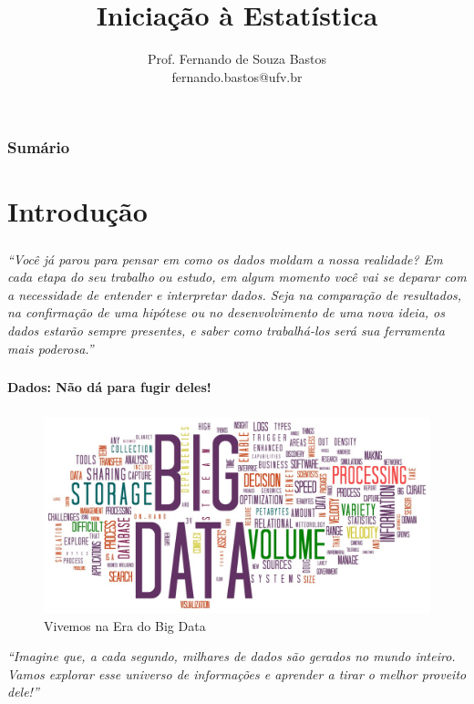 \documentclass[12pt]{beamer}
\title{Iniciação à Estatística}
\author{Prof. Fernando de Souza Bastos\texorpdfstring{\\ fernando.bastos@ufv.br}{}}
\institute{Departamento de Estatística\texorpdfstring{\\ Universidade Federal de Viçosa}{}\texorpdfstring{\\ Campus UFV - Viçosa}{}}
\date{}
\begin{document}

\frame{\titlepage}

\begin{frame}{}
\frametitle{\bf Sumário}
\tableofcontents
\end{frame}

\section{Introdução}
\begin{frame}{}
	\frametitle{}
	\begin{block}{}
		\justifying
		\textit{``Você já parou para pensar em como os dados moldam a nossa realidade? Em cada etapa do seu trabalho ou estudo, em algum momento você vai se deparar com a necessidade de entender e interpretar dados. Seja na comparação de resultados, na confirmação de uma hipótese ou no desenvolvimento de uma nova ideia, os dados estarão sempre presentes, e saber como trabalhá-los será sua ferramenta mais poderosa.''}
	\end{block}
\end{frame}

\begin{frame}{}
	\frametitle{}
	\begin{block}{}
		\justifying
		\begin{center}
			\Large{\bf{Dados: Não dá para fugir deles!}}
		\end{center}
	\end{block}
\end{frame}

\begin{frame}{}
	\frametitle{}
	\begin{block}{}
		\justifying
		\begin{figure}[H]
			\centering
			\caption{Vivemos na Era do Big Data}
			\includegraphics[scale=0.2]{figs/BigData.jpg}
		\end{figure}
		\textit{``Imagine que, a cada segundo, milhares de dados são gerados no mundo inteiro. Vamos explorar esse universo de informações e aprender a tirar o melhor proveito dele!''}
	\end{block}
\end{frame}
\end{document}
